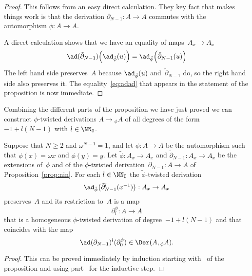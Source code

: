 \begin{proof}
 This follows from an easy direct calculation. They key fact
that makes things work is that the derivation $\partial_{N-1}:A\to A$
commutes with the automorphism $\phi:A\to A$.

 A direct calculation shows that we have an equality of
maps~$A_x\to A_x$
  \[
  \ad(\tilde\partial_{N-1})\Bigl(\ad_{\tilde\phi}(u)\Bigr)
        = \ad_{\tilde\phi}\Bigl(\tilde\partial_{N-1}(u)\Bigr)
  \]
The left hand side preserves~$A$ because $\ad_{\tilde\phi}(u)$
and~$\tilde\partial_{N-1}$ do, so the right hand side also preserves it.
The equality~\eqref{eq:adad} that appears in the statement of the
proposition is now immediate.
\end{proof}

Combining the different parts of the proposition we have just proved we can
construct $\phi$-twisted derivations $A\to{}_\phi A$ of all degrees of the
form $-1+l(N-1)$ with $l\in\NN_0$.

\begin{Corollary}\label{coro:partial:phi}
Suppose that $N\geq2$ and $\omega^{N-1}=1$, and let $\phi:A\to A$ be the
automorphism such that $\phi(x)=\omega x$ and $\phi(y)=y$.
Let $\tilde\phi:A_x\to A_x$ and $\tilde\partial_{N-1}:A_x\to A_x$ be the
extensions of~$\phi$ and of the $\phi$-twisted
derivation~$\partial_{N-1}:A\to A$ of Proposition~\ref{prop:nin}. 
For each $l\in\NN_0$ the $\tilde\phi$-twisted derivation
  \[
  \ad_{\tilde\phi}\bigl(\tilde\partial_{N-1}^l(x^{-1})\bigr):A_x\to A_x
  \]
preserves~$A$ and its restriction to~$A$ is a map 
  \[
  \partial^\phi_l:A\to A
  \]
that is a homogeneous $\phi$-twisted derivation of degree~$-1+l(N-1)$ and
that coincides with the map
  \[
  \ad(\partial_{N-1})^l(\partial_0^\phi) \in \Der(A,{}_\phi A).
  \]
\end{Corollary}

\begin{proof}
This can be proved immediately by induction starting with~ of
the proposition and using part~ for the inductive step.
\end{proof}

